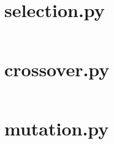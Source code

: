 \documentclass[a4paper, 12pt]{report}
\begin{document}
\newpage

\section{selection.py}
\inputminted[linenos, fontsize=\footnotesize]{Python}{../modules/selection.py}

\newpage

\section{crossover.py}
\inputminted[linenos, fontsize=\footnotesize]{Python}{../modules/crossover.py}

\newpage

\section{mutation.py}
\inputminted[linenos, fontsize=\footnotesize]{Python}{../modules/mutation.py}
\end{document}
